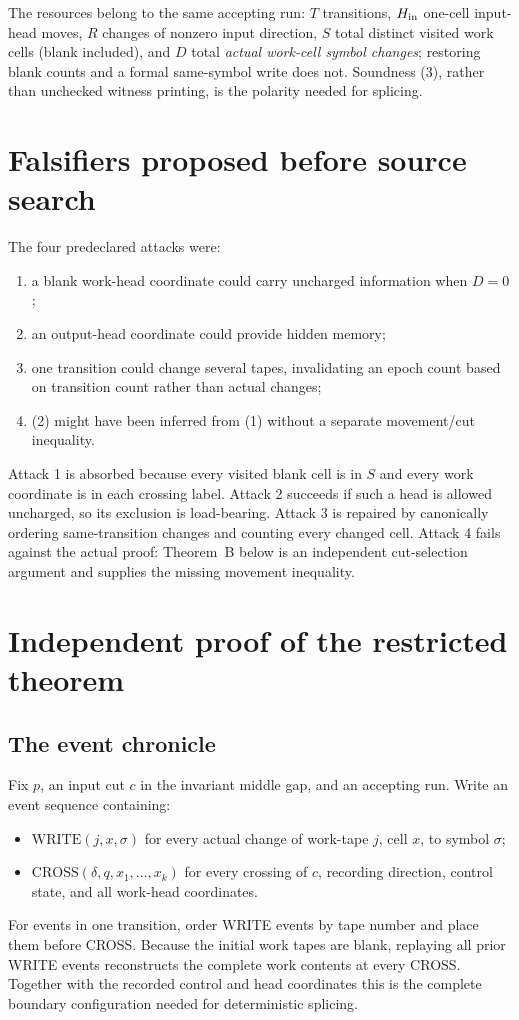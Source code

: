 \documentclass[11pt]{article}
\begin{document}
The resources belong to the same accepting run: $T$ transitions,
$H_{\rm in}$ one-cell input-head moves, $R$ changes of nonzero input direction,
$S$ total distinct visited work cells (blank included), and $D$ total
\emph{actual work-cell symbol changes}; restoring blank counts and a formal
same-symbol write does not.  Soundness (3), rather than unchecked witness
printing, is the polarity needed for splicing.

\section{Falsifiers proposed before source search}
The four predeclared attacks were:
\begin{enumerate}
\item a blank work-head coordinate could carry uncharged information when
  $D=0$;
\item an output-head coordinate could provide hidden memory;
\item one transition could change several tapes, invalidating an epoch count
  based on transition count rather than actual changes;
\item (2) might have been inferred from (1) without a separate movement/cut
  inequality.
\end{enumerate}
Attack 1 is absorbed because every visited blank cell is in $S$ and every work
coordinate is in each crossing label.  Attack 2 succeeds if such a head is
allowed uncharged, so its exclusion is load-bearing.  Attack 3 is repaired by
canonically ordering same-transition changes and counting every changed cell.
Attack 4 fails against the actual proof: Theorem~B below is an independent
cut-selection argument and supplies the missing movement inequality.

\section{Independent proof of the restricted theorem}
\subsection{The event chronicle}
Fix $p$, an input cut $c$ in the invariant middle gap, and an accepting run.
Write an event sequence containing:
\begin{itemize}
\item $\mathrm{WRITE}(j,x,\sigma)$ for every actual change of work-tape $j$,
  cell $x$, to symbol $\sigma$;
\item $\mathrm{CROSS}(\delta,q,x_1,\ldots,x_k)$ for every crossing of $c$,
  recording direction, control state, and all work-head coordinates.
\end{itemize}
For events in one transition, order WRITE events by tape number and place them
before CROSS.  Because the initial work tapes are blank, replaying all prior
WRITE events reconstructs the complete work contents at every CROSS.  Together
with the recorded control and head coordinates this is the complete boundary
configuration needed for deterministic splicing.
\end{document}
